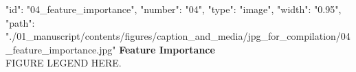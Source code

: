 {
    "id": "04_feature_importance",
    "number": "04",
    "type": "image",
    "width": "0.95\textwidth",
    "path": "./01_manuscript/contents/figures/caption_and_media/jpg_for_compilation/04_feature_importance.jpg"
}
\textbf{Feature Importance}\\
\smallskip
FIGURE LEGEND HERE.
